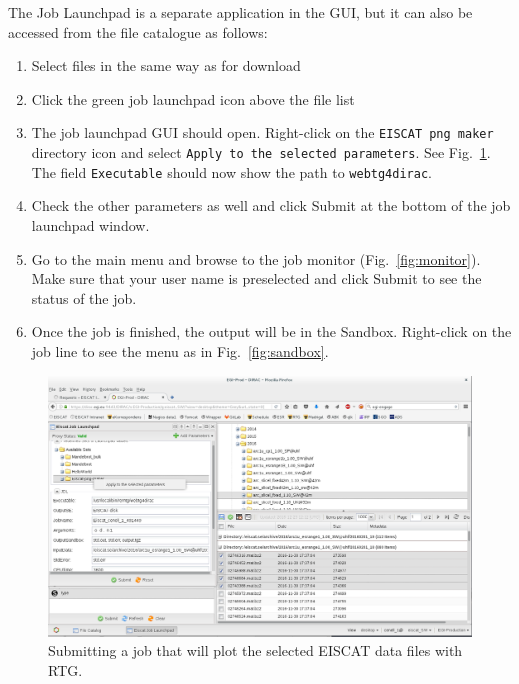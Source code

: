 \documentclass[a4paper]{article}
\begin{document}
The Job Launchpad is a separate application in the GUI, but it can also be accessed from the file catalogue as follows:
\begin{enumerate}
\item Select files in the same way as for download
\item Click the green job launchpad icon above the file list
\item The job launchpad GUI should open. Right-click on the \texttt{EISCAT png maker} directory icon and select \texttt{Apply to the selected parameters}. See Fig.~\ref{fig:submit}.
The field \texttt{Executable} should now show the path to \texttt{webtg4dirac}.
\item Check the other parameters as well and click Submit at the bottom of the job launchpad window.
\item Go to the main menu and browse to the job monitor (Fig.~\ref{fig:monitor}). Make sure that your user name is preselected and click Submit to see the status of the job.
\item Once the job is finished, the output will be in the Sandbox. Right-click on the job line to see the menu as in Fig.~\ref{fig:sandbox}.
\end{enumerate}


\begin{figure}[htb]
  \centering
  \includegraphics[width=1.0\linewidth]{dirac-gui-jobsubm}
  \caption{Submitting a job that will plot the selected EISCAT data files with RTG.}
  \label{fig:submit}
\end{figure}
\end{document}
